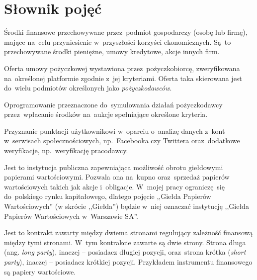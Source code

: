 \documentclass[a4paper,twoside,titlepage,openright]{book}
\begin{document}
\chapter*{Słownik pojęć}
\begin{description}[style=nextline]
	\item[Aktywa finansowe] Środki finansowe przechowywane przez~podmiot gospodarczy (osobę lub firmę), mające na~celu przyniesienie w~przyszłości korzyści ekonomicznych. Są~to przechowywane środki pieniężne, umowy kredytowe, akcje innych firm.
	\item[Aukcja pożyczkowa] Oferta umowy pożyczkowej wystawiona przez~pożyczkobiorcę, zweryfikowana na~określonej platformie zgodnie z~jej kryteriami. Oferta taka skierowana jest do~wielu podmiotów określonych jako \textit{pożyczkodawców}.
	\item[Automat inwestycyjny] Oprogramowanie przeznaczone do~symulowania działań pożyczkodawcy przez~wpłacanie środków na~aukcje spełniające określone kryteria.
	\item[FriendlyScore] Przyznanie punktacji użytkownikowi w~oparciu o~analizę danych z~kont w~serwisach społecznościowych, np.~Facebooka czy Twittera oraz~dodatkowe weryfikacje, np.~weryfikację pracodawcy.
	\item[Giełda Papierów Wartościowych] Jest to instytucja publiczna zapewniająca możliwość obrotu giełdowymi papierami wartościowymi. Pozwala ona na~kupno oraz~sprzedaż papierów wartościowych takich jak akcje i~obligacje. W~mojej pracy ograniczę~się do~polskiego rynku kapitałowego, dlatego pojęcie ,,Giełda Papierów Wartościowych'' (w skrócie ,,Giełda'') będzie w~niej oznaczać instytucję ,,Giełda Papierów Wartościowych w~Warszawie SA''.\cite{gielda}
	\item[Instrument finansowy (ang. \textit{financial instrument})]  Jest to kontrakt zawarty między dwiema stronami regulujący zależność finansową między tymi stronami. W~tym kontrakcie zawarte są dwie strony. Strona długa (ang. \textit{long party}), inaczej -- posiadacz długiej pozycji, oraz~strona krótka (\textit{short party}), inaczej -- posiadacz krótkiej pozycji. Przykładem instrumentu finansowego są papiery wartościowe.\cite{inwestycje}

\end{description}
\end{document}

